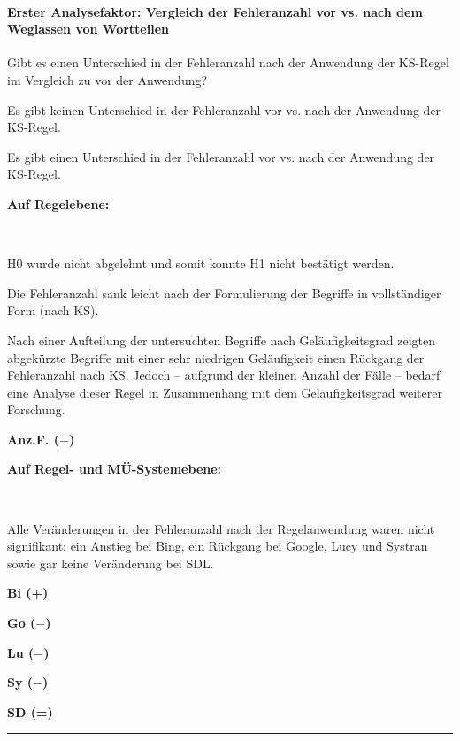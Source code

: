 \paragraph*{Erster Analysefaktor: Vergleich der Fehleranzahl vor vs. nach dem Weglassen von Wortteilen}
\begin{description}[font=\normalfont\bfseries]
\item [Fragestellung:] Gibt es einen Unterschied in der Fehleranzahl nach der Anwendung der KS-Regel im Vergleich zu vor der Anwendung?
\item [H0 --] Es gibt keinen Unterschied in der Fehleranzahl vor vs. nach der Anwendung der KS-Regel.
\item [H1 --] Es gibt einen Unterschied in der Fehleranzahl vor vs. nach der Anwendung der KS-Regel.
\item [Resultat]
\end{description}
\noindent
\parbox[t]{.8\textwidth}{\textbf{Auf Regelebene:}}\\
\parbox[t]{.8\textwidth}{
H0 wurde nicht abgelehnt und somit konnte H1 nicht bestätigt werden.

Die Fehleranzahl sank leicht nach der Formulierung der Begriffe in vollständiger Form (nach KS).

Nach einer Aufteilung der untersuchten Begriffe nach Geläufigkeitsgrad zeigten abgekürzte Begriffe mit einer sehr niedrigen Geläufigkeit einen Rückgang der Fehleranzahl nach KS. Jedoch -- aufgrund der kleinen Anzahl der Fälle -- bedarf eine Analyse dieser Regel in Zusammenhang mit dem Geläufigkeitsgrad weiterer Forschung.
}
\parbox[t]{.04\textwidth}{}
\parbox[t]{.15\textwidth}{\textbf{Anz.F. ($-$)}}

\noindent
\parbox[t]{.8\textwidth}{
\textbf{Auf Regel- und MÜ-Systemebene:}
}\\
\parbox[t]{.8\textwidth}{
Alle Veränderungen in der Fehleranzahl nach der Regelanwendung waren nicht signifikant: ein Anstieg bei Bing, ein Rückgang bei Google, Lucy und Systran sowie gar keine Veränderung bei SDL.
}
\parbox[t]{.04\textwidth}{}
\parbox[t]{.15\textwidth}{
\textbf{Bi (+)}

{ \textbf{Go ($-$)}}

{ \textbf{Lu ($-$)}}

{ \textbf{Sy ($-$)}}

 \textbf{SD (=)}
}
\smallskip
\hrule
\newpage
